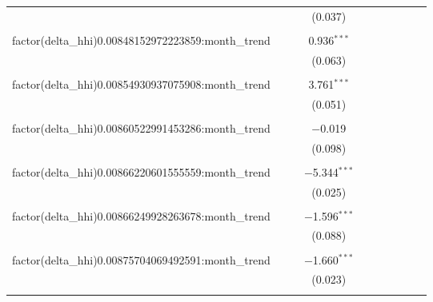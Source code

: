 \begin{table}[H]
{\begin{tabular}{@{\extracolsep{5pt}}lccccccccc}
   &  &  & (0.037) &  &  &  &  &  &  \\  

   & & & & & & & & & \\  

  factor(delta\_hhi)0.00848152972223859:month\_trend &  &  & 0.936$^{***}$ &  &  &  &  &  &  \\  

   &  &  & (0.063) &  &  &  &  &  &  \\  

   & & & & & & & & & \\  

  factor(delta\_hhi)0.00854930937075908:month\_trend &  &  & 3.761$^{***}$ &  &  &  &  &  &  \\  

   &  &  & (0.051) &  &  &  &  &  &  \\  

   & & & & & & & & & \\  

  factor(delta\_hhi)0.00860522991453286:month\_trend &  &  & $-$0.019 &  &  &  &  &  &  \\  

   &  &  & (0.098) &  &  &  &  &  &  \\  

   & & & & & & & & & \\  

  factor(delta\_hhi)0.00866220601555559:month\_trend &  &  & $-$5.344$^{***}$ &  &  &  &  &  &  \\  

   &  &  & (0.025) &  &  &  &  &  &  \\  

   & & & & & & & & & \\  

  factor(delta\_hhi)0.00866249928263678:month\_trend &  &  & $-$1.596$^{***}$ &  &  &  &  &  &  \\  

   &  &  & (0.088) &  &  &  &  &  &  \\  

   & & & & & & & & & \\  

  factor(delta\_hhi)0.00875704069492591:month\_trend &  &  & $-$1.660$^{***}$ &  &  &  &  &  &  \\  

   &  &  & (0.023) &  &  &  &  &  &  \\  

   & & & & & & & & & \\  


\end{tabular}}
\end{table}
